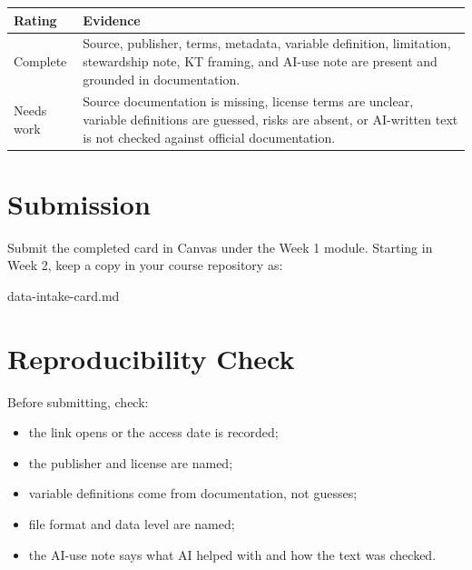 \documentclass[
  letterpaper,
  DIV=11,
  numbers=noendperiod,
  oneside]{scrreprt}
\newenvironment{Shaded}{\begin{snugshade}}{\end{snugshade}}
\newcommand{\NormalTok}[1]{\textcolor[rgb]{0.00,0.23,0.31}{#1}}
\providecommand{\tightlist}{%
  \setlength{\itemsep}{0pt}\setlength{\parskip}{0pt}}
\begin{document}

\begin{longtable}[]{@{}
  >{\raggedright\arraybackslash}p{}
  >{\raggedright\arraybackslash}p{}@{}}
\toprule\noalign{}
\begin{minipage}[b]{\linewidth}\raggedright
Rating
\end{minipage} & \begin{minipage}[b]{\linewidth}\raggedright
Evidence
\end{minipage} \\
\midrule\noalign{}
\endhead
\bottomrule\noalign{}
\endlastfoot
Complete & Source, publisher, terms, metadata, variable definition,
limitation, stewardship note, KT framing, and AI-use note are present
and grounded in documentation. \\
Needs work & Source documentation is missing, license terms are unclear,
variable definitions are guessed, risks are absent, or AI-written text
is not checked against official documentation. \\
\end{longtable}

\section*{Submission}\label{submission}


Submit the completed card in Canvas under the Week 1 module. Starting in
Week 2, keep a copy in your course repository as:

\begin{Shaded}
\begin{Highlighting}[numbers=left,,]
\NormalTok{data{-}intake{-}card.md}
\end{Highlighting}
\end{Shaded}

\section*{Reproducibility Check}\label{reproducibility-check}


Before submitting, check:

\begin{itemize}
\tightlist
\item
  the link opens or the access date is recorded;
\item
  the publisher and license are named;
\item
  variable definitions come from documentation, not guesses;
\item
  file format and data level are named;
\item
  the AI-use note says what AI helped with and how the text was checked.
\end{itemize}
\end{document}

